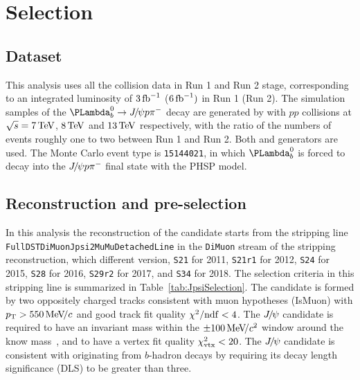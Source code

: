 \section{Selection}

\subsection{Dataset}
This analysis uses all the \pp collision data in Run 1 and Run 2 stage, 
corresponding to an integrated luminosity of $3\text{\,fb}^{-1}$ ($6\text{\,fb}^{-1})$ in Run 1 (Run 2).
The simulation samples of the $\LbJpsiPPi$ decay are generated by \pythia with $pp$ collisions at $\sqrt{s}=7\text{\,Te\kern -0.1em V}$, $8\text{\,Te\kern -0.1em V}$ and $13\text{\,Te\kern -0.1em V}$ respectively,
with the ratio of the numbers of events roughly one to two between Run 1 and Run 2.
Both  and  generators are used.
The Monte Carlo event type is \texttt{15144021}, 
in which $\Lb$ is forced to decay into the ${{J\mskip -3mu/\mskip -2mu\psi}}{p}{{\pi}^-}$ final state with the PHSP model.

%
\subsection{Reconstruction and pre-selection}
In this analysis the reconstruction of the \Lb candidate starts
from the stripping line \texttt{FullDSTDiMuonJpsi2MuMuDetachedLine} in the \texttt{DiMuon} stream 
of the stripping reconstruction,
which different version, 
\texttt{S21} for 2011, 
\texttt{S21r1} for 2012, 
\texttt{S24} for 2015, 
\texttt{S28} for 2016, 
\texttt{S29r2} for 2017, 
and \texttt{S34} for 2018. 
The selection criteria in this stripping line is summarized in Table~\ref{tab:JpsiSelection}.
The \jpsi candidate is formed by two oppositely charged tracks consistent with muon hypotheses (IsMuon) 
with $p_{\mathrm{T}}>550\text{\,Me\kern -0.1em V\!/}c$ and good track fit quality $\chi^2/\mathrm{ndf}<4$.
The ${{J\mskip -3mu/\mskip -2mu\psi}}$ candidate is required to have an invariant mass within the $\pm100\text{\,Me\kern -0.1em V\!/}c^2$ window 
around the know \jpsi mass~\supercite{PDG2014}, and to have a vertex fit quality $\chi^2_{\text{vtx}}<20$.
The ${{J\mskip -3mu/\mskip -2mu\psi}}$ candidate is consistent with originating from $b$-hadron decays by requiring its decay length significance (DLS) to be greater than three.

